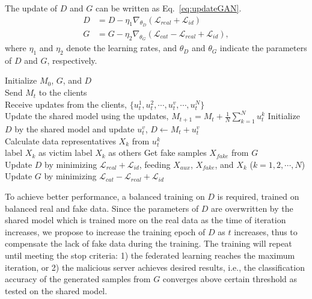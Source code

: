 \documentclass[10pt, conference, letterpaper]{IEEEtran}
\newcommand{\alg}{mGAN-AI}
\begin{document}
The update of $D$ and $G$ can be written as Eq.~\ref{eq:updateGAN}.
\begin{equation}
\begin{split}
D &= D - \eta_1\nabla_{\theta_D} (\mathcal{L}_{real} + \mathcal{L}_{id}) \\
G &= G - \eta_2\nabla_{\theta_G} (\mathcal{L}_{cat} - \mathcal{L}_{real} + \mathcal{L}_{id}),
\end{split}
\label{eq:updateGAN}
\end{equation}
where $\eta_1$ and $\eta_2$ denote the learning rates, and $\theta_D$ and $\theta_G$ indicate the parameters of $D$ and $G$, respectively.
\begin{algorithm}[t]
\caption{Passive attack of \alg}
Initialize $M_0$, $G$, and $D$ \\
        {
            Send $M_{t}$ to the clients \\
            Receive updates from the clients, $\{u_t^1, u_t^2, \cdots, u_t^v, \cdots, u_t^{N} \}$\\
            Update the shared model using the updates, $\displaystyle M_{t+1} = M_{t} + \frac{1}{N}\sum_{k=1}^{N}u^k_t$\;
            Initialize $D$ by the shared model and update $u_t^v$, $D \leftarrow M_{t} + u_t^v$ \\
            {
              Calculate data representatives $X_k$ from $u_t^k$ \\
              {
                  label $X_k$ as victim
              }
              \Else
              {
                  label $X_k$ as others
              }
			}
            Get fake samples $X_{fake}$ from $G$ \\
            Update $D$ by minimizing
            $\mathcal{L}_{real} + \mathcal{L}_{id}$, feeding $X_{aux}$, $X_{fake}$, and $X_k$ ($k=1,2,\cdots,N$) \\
            Update $G$ by minimizing $\mathcal{L}_{cat} - \mathcal{L}_{real} + \mathcal{L}_{id}$
        }
\label{alg:passive_attack}
\end{algorithm}

To achieve better performance, a balanced training on $D$ is required, trained on balanced real and fake data. Since the parameters of $D$ are overwritten by the shared model which is trained more on the real data as the time of iteration increases, we propose to increase the training epoch of $D$ as $t$ increases, thus to compensate the lack of fake data during the training. The training will repeat until meeting the stop criteria: 1) the federated learning reaches the maximum iteration, or 2) the malicious server achieves desired results, i.e., the classification accuracy of the generated samples from $G$ converges above certain threshold as tested on the shared model.
\end{document}
